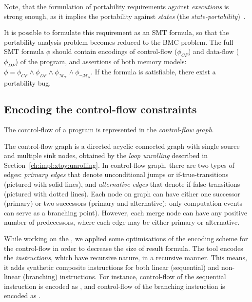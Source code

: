 Note, that the formulation of portability requirements against \textit{executions} is strong enough, as it implies the portability against \textit{states} (the \textit{state-portability})~\cite{Porthos17}.

It is possible to formulate this requirement as an SMT formula, so that the portability analysis problem becomes reduced to the BMC problem. The full SMT formula $\phi$ should contain encodings of control-flow ($\phi_{CF}$) and data-flow ($\phi_{DF}$) of the program, and assertions of both memory models: $\phi = \phi_{CF} \land \phi_{DF} \land \phi_{\mathcal{M_T}} \land \phi_{\lnot\mathcal{M_S}}$. If the formula is satisfiable, there exist a portability bug.

\subsection{Encoding the control-flow constraints}
\label{ch:port:enc:cf}

The control-flow of a program is represented in the \textit{control-flow graph}.

The control-flow graph is a directed acyclic connected graph with single source and multiple sink nodes, obtained by the \textit{loop unrolling} described in Section~\ref{ch:impl:xtoy:unrolling}.%
In control-flow graph, there are two types of edges: \textit{primary edges} that denote unconditional jumps or if-true-transitions (pictured with solid lines), and \textit{alternative edges} that denote if-false-transitions (pictured with dotted lines). Each node on graph can have either one successor (primary) or two successors (primary and alternative); only computation events can serve as a branching point). However, each merge node can have any positive number of predecessors, where each edge may be either primary or alternative.

While working on the , we applied some optimisations of the encoding scheme for the control-flow in order to decrease the size of result formula. 
The  tool encodes the \textit{instructions}, which have recursive nature, in a recursive manner. This means, it adds synthetic composite instructions for both linear (sequential) and non-linear (branching) instructions. 
For instance, control-flow of the sequential instruction  is encoded as 
, 
and control-flow of the branching instruction  is encoded as 
.

